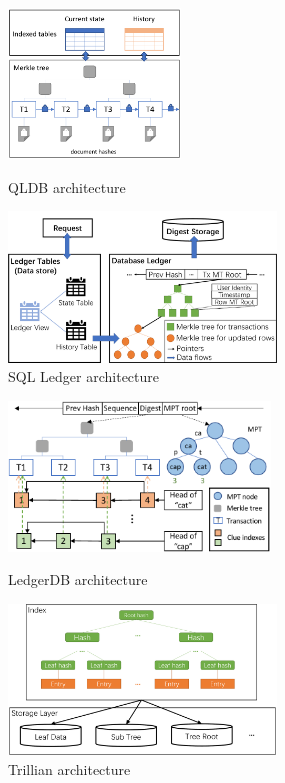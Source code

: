 \documentclass[11pt,dvipdfm]{article}
\begin{document}
\begin{figure}[t]
    \centering
    \begin{minipage}{0.48\textwidth}
        \centering
        \includegraphics[height=4cm]{figs/arch_qldb.pdf}
        \caption{QLDB architecture}
        \label{fig:qldb}
    \end{minipage}
    \begin{minipage}{0.48\textwidth}
        \centering
        \includegraphics[height=4cm]{figs/arch_sqlledger.pdf}
        \caption{SQL Ledger architecture}
        \label{fig:sqlledger}
    \end{minipage}
\end{figure}

\begin{figure}[t]
    \centering
    \begin{minipage}{0.48\textwidth}
        \centering
        \includegraphics[height=4cm]{figs/arch_ledgerdb.pdf}
        \caption{LedgerDB architecture}
        \label{fig:ledgerdb}
    \end{minipage}
    \begin{minipage}{0.48\textwidth}
        \centering
        \includegraphics[height=4cm]{figs/arch_trillian.pdf}
        \caption{Trillian architecture}
        \label{fig:trillian}
    \end{minipage}
\end{figure}
\end{document}
